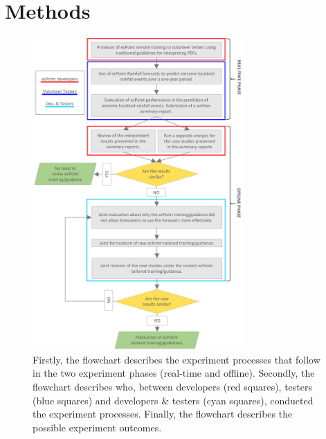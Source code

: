 \documentclass[twocol]{ametsocV5} %
\begin{document}
\section{Methods} 

\begin{figure}
\centerline{\includegraphics[width=19pc]{manuscript/Figures/Methods_FlowChart.png}}
\caption{Firstly, the flowchart describes the experiment processes that follow in the two experiment phases (real-time and offline). Secondly, the flowchart describes who, between developers (red squares), testers (blue squares) and developers & testers (cyan squares), conducted the experiment processes. Finally, the flowchart describes the possible experiment outcomes.}
\label{FlowChart}
\end{figure}
\end{document}
